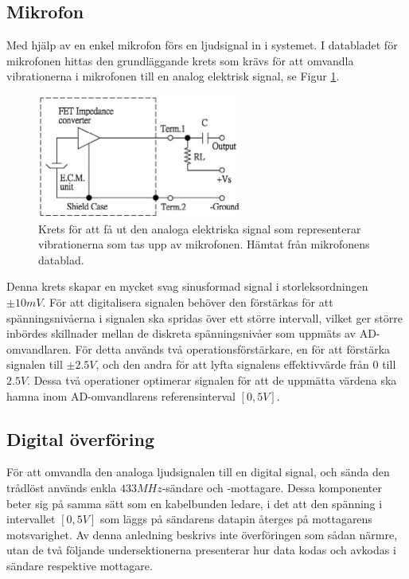 \documentclass[a4paper,10pt]{article}
\begin{document}
\subsection{Mikrofon}

Med hjälp av en enkel mikrofon förs en ljudsignal in i systemet. 
I databladet för mikrofonen hittas den grundläggande krets som krävs för att 
omvandla vibrationerna i mikrofonen till en analog elektrisk signal, se Figur 
\ref{fig:mikrofon}.

\begin{figure}[h]
    \centering
    \includegraphics[width=0.6\textwidth]{mik.jpg}
    \caption{Krets för att få ut den analoga elektriska signal som representerar
	     vibrationerna som tas upp av mikrofonen. Hämtat från mikrofonens
	     datablad.}
    \label{fig:mikrofon}
\end{figure}

Denna krets skapar en mycket svag sinusformad signal i storleksordningen 
$\pm 10 mV$. För att digitalisera signalen behöver den förstärkas för att 
spänningsnivåerna i signalen ska spridas över ett större intervall, vilket ger 
större inbördes skillnader mellan de diskreta spänningsnivåer som uppmäts av 
AD-omvandlaren. För detta används två operationsförstärkare, en för att 
förstärka signalen till $\pm 2.5 V$, och den andra för att lyfta signalens 
effektivvärde från $0$ till $2.5 V$. Dessa två operationer optimerar signalen
för att de uppmätta värdena ska hamna inom AD-omvandlarens referensinterval
$[0,5V]$.

\subsection{Digital överföring}

För att omvandla den analoga ljudsignalen till en digital signal, och sända den 
trådlöst används enkla $433 MHz$-sändare och -mottagare. Dessa komponenter
beter sig på samma sätt som en kabelbunden ledare, i det att den spänning i 
intervallet $[0, 5V]$ som läggs på sändarens datapin återges på mottagarens
motsvarighet. Av denna anledning beskrivs inte överföringen som sådan närmre,
utan de två följande undersektionerna presenterar hur data kodas och avkodas
i sändare respektive mottagare.
\end{document}
